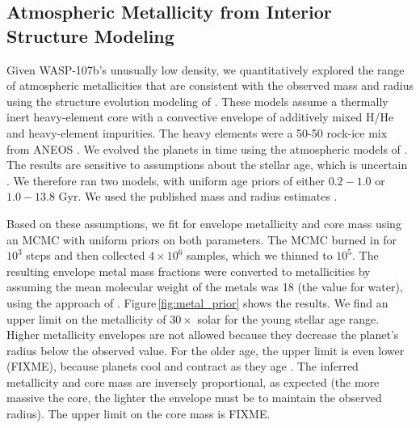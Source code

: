 \documentclass[twocolumn]{aastex61}
\begin{document}
\subsection{Atmospheric Metallicity from Interior Structure Modeling}
\label{sec:interior}
Given WASP-107b's unusually low density, we quantitatively explored the range of atmospheric metallicities that are consistent with the observed mass and radius using the structure evolution modeling of \cite{thorngren16}.  These models assume a thermally inert heavy-element core with a convective envelope of additively mixed H/He \citep{saumon95} and heavy-element impurities.  The heavy elements were a 50-50 rock-ice mix from ANEOS \citep{thompson90}.  We evolved the planets in time using the atmospheric models of \cite{fortney07}.  The results are sensitive to assumptions about the stellar age, which is uncertain \citep[either $0.6\pm0.2$ to $8.3\pm4.3$ Gyr depending on model assumptions;][]{mocnik17}. We therefore ran two models, with uniform age priors of either $0.2-1.0$ or $1.0-13.8$ Gyr.  We used the published mass and radius estimates \citep[$0.12\pm0.01\,M_\mathrm{J}$, $0.94\pm0.02$;][]{anderson17}.  %

Based on these assumptions, we fit for envelope metallicity and core mass using an MCMC with uniform priors on both parameters.  The MCMC burned in for $10^3$ steps and then collected $4\times10^6$ samples, which we thinned to $10^5$.  The resulting envelope metal mass fractions were converted to metallicities by assuming the mean molecular weight of the metals was 18 (the value for water), using the approach of \cite{fortney13}. Figure\,\ref{fig:metal_prior} shows the results.  We find an upper limit on the metallicity of $30\times$ solar for the young stellar age range.  Higher metallicity envelopes are not allowed because they decrease the planet's radius below the observed value.  For the older age, the upper limit is even lower (FIXME), because planets cool and contract as they age \citep{fortney08}.  The inferred metallicity and core mass are inversely proportional, as expected (the more massive the core, the lighter the envelope must be to maintain the observed radius). The upper limit on the core mass is FIXME.
\end{document}
